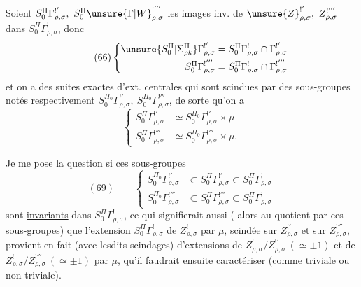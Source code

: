 Soient $S_0^\Pi\Gamma^{!'}_{\rho,\sigma},\ S_0^\Pi\unsure{\Gamma|W}^{!'''}_{\rho,\sigma}$\unsure{)|]}
les images inv. de $\unsure{Z}^{!'}_{\rho,\sigma},\ Z^{!'''}_{\rho,\sigma}$
dans $S_0^\Pi\Gamma^!_{\rho,\sigma}$, donc
\[
\tag{66}
\left\{
\begin{aligned}
\unsure{S_0^\Pi|\Sigma_{\rho k}^{\Pi}}\Gamma^{!'}_{\rho,\sigma}
&=S_0^\Pi\Gamma^!_{\rho,\sigma}\cap\Gamma^{!'}_{\rho,\sigma}\\
S_0^\Pi\Gamma^{!'''}_{\rho,\sigma}
&=S_0^\Pi\Gamma^!_{\rho,\sigma}\cap\Gamma^{!'''}_{\rho,\sigma}
\end{aligned}
\right.
\]
et on a des suites exactes d'ext. centrales
qui sont scindues par des sous-groupes notés respectivement
$S_0^{\Pi_0}\Gamma^{!'}_{\rho,\sigma},\ S_0^{\Pi_0}\Gamma^{!'''}_{\rho,\sigma}$,
de sorte qu'on a
\[
\tag{68}
\left\{
\begin{aligned}
S_0^\Pi\Gamma^{!'}_{\rho,\sigma}
&\simeq S_0^{\Pi_0}\Gamma^{!'}_{\rho,\sigma}\times\mu\\
S_0^\Pi\Gamma^{!'''}_{\rho,\sigma}
&\simeq S_0^{\Pi_0}\Gamma^{!'''}_{\rho,\sigma}\times\mu.
\end{aligned}
\right.
\]


Je me pose la question si ces sous-groupes
\[
(69)\qquad
\left\{
\begin{aligned}
S_0^{\Pi_0}\Gamma_{\rho,\sigma}^{!'}&\subset S_0^{\Pi}\Gamma_{\rho,\sigma}^{!'}\subset S_0^{\Pi}\Gamma_{\rho,\sigma}^{!}\\
S_0^{\Pi_0}\Gamma_{\rho,\sigma}^{!'''}&\subset S_0^{\Pi}\Gamma_{\rho,\sigma}^{!'''}\subset S_0^{\Pi}\Gamma_{\rho,\sigma}^{!}
\end{aligned}
\right.
\]
sont \uline{invariants} dans $S_0^{\Pi}\Gamma_{\rho,\sigma}^{!}$, ce qui
signifierait aussi ( alors au quotient par ces sous-groupes)
que l'extension $S_0^{\Pi}\Gamma_{\rho,\sigma}^{!}$ de $Z_{\rho,\sigma}^{!}$
par $\mu$, scindée sur $Z_{\rho,\sigma}^{!'}$ et sur $Z_{\rho,\sigma}^{!'''}$,
provient en fait (avec lesdits scindages) d'extensions de
$Z_{\rho,\sigma}^{!}/Z_{\rho,\sigma}^{!'}\ (\simeq\pm1)$ et de
$Z_{\rho,\sigma}^{!}/Z_{\rho,\sigma}^{!'''}\ (\simeq\pm1)$ par $\mu$,
qu'il faudrait ensuite caractériser (comme triviale ou non triviale).

